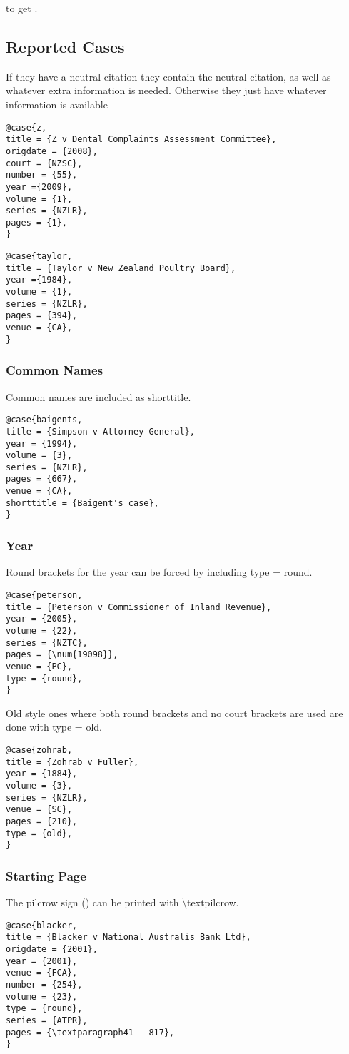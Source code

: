 \documentclass{nzlaw}
\newcommand{\s}{\textbackslash}
\begin{document}
to get \cite{astrazeneca}.

\subsection{Reported Cases}
If they have a neutral citation they contain the neutral citation, as well as whatever extra information is needed. Otherwise they just have whatever information is available

\begin{verbatim}
@case{z,
title = {Z v Dental Complaints Assessment Committee},
origdate = {2008},
court = {NZSC},
number = {55},
year ={2009},
volume = {1},
series = {NZLR},
pages = {1},
}
\end{verbatim}

\begin{verbatim}
@case{taylor,
title = {Taylor v New Zealand Poultry Board},
year ={1984},
volume = {1},
series = {NZLR},
pages = {394},
venue = {CA},
}
\end{verbatim}
\subsubsection{Common Names}

Common names are included as shorttitle.
\begin{verbatim}
@case{baigents,
title = {Simpson v Attorney-General},
year = {1994},
volume = {3},
series = {NZLR},
pages = {667},
venue = {CA},
shorttitle = {Baigent's case},
}
\end{verbatim}

\subsubsection{Year}

Round brackets for the year can be forced by including type = {round}.
\begin{verbatim}
@case{peterson,
title = {Peterson v Commissioner of Inland Revenue},
year = {2005},
volume = {22},
series = {NZTC},
pages = {\num{19098}},
venue = {PC},
type = {round},
}
\end{verbatim}


Old style ones where both round brackets and no court brackets are used are done with type = {old}.
\begin{verbatim}
@case{zohrab,
title = {Zohrab v Fuller},
year = {1884},
volume = {3},
series = {NZLR},
venue = {SC},
pages = {210},
type = {old},
}
\end{verbatim}

\subsubsection{Starting Page}

The pilcrow sign (\textparagraph) can be printed with {\s}textpilcrow.

\begin{verbatim}
@case{blacker,
title = {Blacker v National Australis Bank Ltd},
origdate = {2001},
year = {2001},
venue = {FCA},
number = {254},
volume = {23},
type = {round},
series = {ATPR},
pages = {\textparagraph41-- 817},
}
\end{verbatim}
\end{document}
